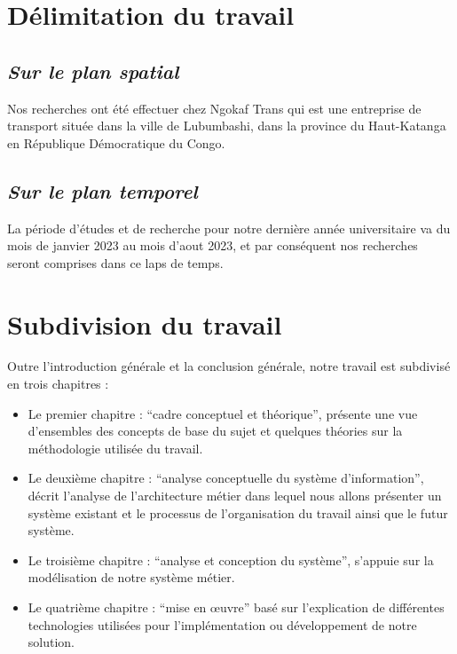     \section[Délimitation du travail]{Délimitation du travail}
        \subsection[Sur le plan spatial]{\textit{Sur le plan spatial}}
        Nos recherches ont été effectuer chez Ngokaf Trans qui est une entreprise de transport
        située dans la ville de Lubumbashi, dans la province du Haut-Katanga en République Démocratique du Congo.
        \subsection[Sur le plan temporel]{\textit{Sur le plan temporel}}
        La période d’études et de recherche pour notre dernière 
        année universitaire va du mois de janvier 2023 au mois d’aout 2023,
        et par conséquent nos recherches seront comprises dans ce laps de temps.
    \section[Subdivision du travail]{Subdivision du travail}
    Outre l’introduction générale et la conclusion générale, notre travail est subdivisé
    en trois chapitres :
    \par
        \begin{itemize}
            \setlength{\itemsep}{0pt}
            \item [\ding{226}] Le premier chapitre : \enquote{cadre conceptuel et théorique}, présente une vue
            d’ensembles des concepts de base du sujet et quelques théories sur la méthodologie
            utilisée du travail.
            \item [\ding{226}] Le deuxième chapitre : \enquote{analyse conceptuelle du système d’information}, 
            décrit l’analyse de l’architecture métier dans lequel nous allons présenter un système existant
            et le processus de l’organisation du travail ainsi que le futur système.
            \item [\ding{226}] Le troisième chapitre : \enquote{analyse et conception du système}, s’appuie sur la
            modélisation de notre système métier.          
            \item [\ding{226}] Le quatrième chapitre : \enquote{mise en œuvre} basé sur l’explication de différentes
            technologies utilisées pour l’implémentation ou développement de notre solution.
        \end{itemize} 
